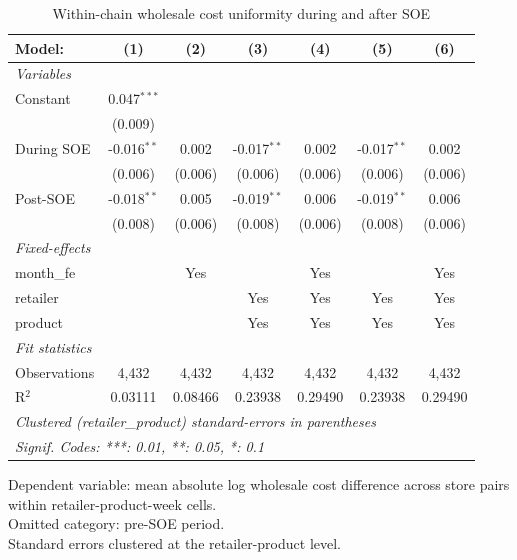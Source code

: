 
\begin{table}[htbp]
   \caption{\label{tab:uniformity_wholesale} Within-chain wholesale cost uniformity during and after SOE}
   \centering
   \begin{tabular}{lcccccc}
      \tabularnewline \midrule \midrule
      Model:       & (1)           & (2)     & (3)           & (4)     & (5)           & (6)\\  
      \midrule
      \emph{Variables}\\
      Constant     & 0.047$^{***}$ &         &               &         &               &   \\   
                   & (0.009)       &         &               &         &               &   \\   
      During SOE   & -0.016$^{**}$ & 0.002   & -0.017$^{**}$ & 0.002   & -0.017$^{**}$ & 0.002\\   
                   & (0.006)       & (0.006) & (0.006)       & (0.006) & (0.006)       & (0.006)\\   
      Post-SOE     & -0.018$^{**}$ & 0.005   & -0.019$^{**}$ & 0.006   & -0.019$^{**}$ & 0.006\\   
                   & (0.008)       & (0.006) & (0.008)       & (0.006) & (0.008)       & (0.006)\\   
      \midrule
      \emph{Fixed-effects}\\
      month\_fe    &               & Yes     &               & Yes     &               & Yes\\  
      retailer     &               &         & Yes           & Yes     & Yes           & Yes\\  
      product      &               &         & Yes           & Yes     & Yes           & Yes\\  
      \midrule
      \emph{Fit statistics}\\
      Observations & 4,432         & 4,432   & 4,432         & 4,432   & 4,432         & 4,432\\  
      R$^2$        & 0.03111       & 0.08466 & 0.23938       & 0.29490 & 0.23938       & 0.29490\\  
      \midrule \midrule
      \multicolumn{7}{l}{\emph{Clustered (retailer\_product) standard-errors in parentheses}}\\
      \multicolumn{7}{l}{\emph{Signif. Codes: ***: 0.01, **: 0.05, *: 0.1}}\\
   \end{tabular}
   
   \par \raggedright 
   Dependent variable: mean absolute log wholesale cost difference across store pairs within retailer-product-week cells.\\
   Omitted category: pre-SOE period.\\
   Standard errors clustered at the retailer-product level.
\end{table}


